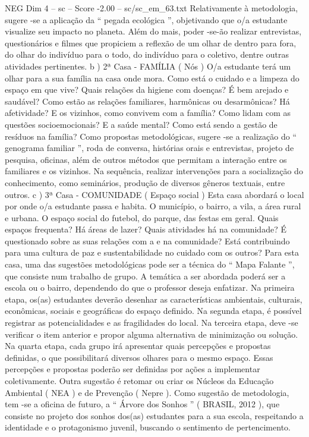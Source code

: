 \begin{textsample}{NEG Dim 4 – sc – Score -2.00 – sc/sc\_em\_63.txt}
Relativamente à metodologia, sugere -se a aplicação da “ pegada ecológica ”, objetivando que o/a estudante visualize seu impacto no planeta.
Além do mais, poder -se-ão realizar entrevistas, questionários e filmes que propiciem a reflexão de um olhar de dentro para fora, do olhar do indivíduo para o todo, do indivíduo para o coletivo, dentre outras atividades pertinentes. b ) 2ª Casa - FAMÍLIA ( Nós ) O/a estudante terá um olhar para a sua família na casa onde mora.
Como está o cuidado e a limpeza do espaço em que vive?
Quais relações da higiene com doenças?
É bem arejado e saudável?
Como estão as relações familiares, harmônicas ou desarmônicas?
Há afetividade?
E os vizinhos, como convivem com a família?
Como lidam com as questões socioemocionais?
E a saúde mental?
Como está sendo a gestão de resíduos na família?
Como propostas metodológicas, sugere -se a realização do “ genograma familiar ”, roda de conversa, histórias orais e entrevistas, projeto de pesquisa, oficinas, além de outros métodos que permitam a interação entre os familiares e os vizinhos.
Na sequência, realizar intervenções para a socialização do conhecimento, como seminários, produção de diversos gêneros textuais, entre outros. c ) 3ª Casa - COMUNIDADE ( Espaço social ) Esta casa abordará o local por onde o/a estudante passa e habita.
O município, o bairro, a vila, a área rural e urbana.
O espaço social do futebol, do parque, das festas em geral.
Quais espaços frequenta?
Há áreas de lazer?
Quais atividades há na comunidade?
É questionado sobre as suas relações com a e na comunidade?
Está contribuindo para uma cultura de paz e sustentabilidade no cuidado com os outros?
Para esta casa, uma das sugestões metodológicas pode ser a técnica do “ Mapa Falante ”, que consiste num trabalho de grupo.
A temática a ser abordada poderá ser a escola ou o bairro, dependendo do que o professor deseja enfatizar.
Na primeira etapa, os(as) estudantes deverão desenhar as características ambientais, culturais, econômicas, sociais e geográficas do espaço definido.
Na segunda etapa, é possível registrar as potencialidades e as fragilidades do local.
Na terceira etapa, deve -se verificar o item anterior e propor alguma alternativa de minimização ou solução.
Na quarta etapa, cada grupo irá apresentar quais percepções e propostas definidas, o que possibilitará diversos olhares para o mesmo espaço.
Essas percepções e propostas poderão ser definidas por ações a implementar coletivamente.
Outra sugestão é retomar ou criar os Núcleos da Educação Ambiental ( NEA ) e de Prevenção ( Nepre ).
Como sugestão de metodologia, tem -se a oficina de futuro, a “ Árvore dos Sonhos ” ( BRASIL, 2012 ), que consiste no projeto dos sonhos dos(as) estudantes para a sua escola, respeitando a identidade e o protagonismo juvenil, buscando o sentimento de pertencimento.

\end{textsample}

